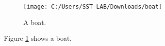 \documentclass{article}
\begin{document}
\begin{figure}
	\texttt{[image: C:/Users/SST-LAB/Downloads/boat]}
	\caption{A boat.}
	\label{fig:boat1}
\end{figure}
Figure \ref{fig:boat1} shows a boat.
\end{document}
